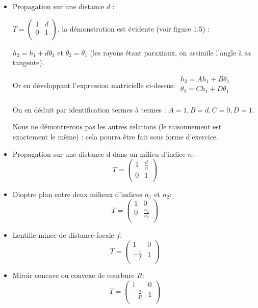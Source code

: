 \documentclass{book}
\begin{document}
\begin{itemize}[label=\textbullet, font=\LARGE \color{blue}]
    \item Propagation sur une distance $d$ :

$T = \begin{pmatrix}
            1 & d \\
            0 & 1 \\
            \end{pmatrix}$, la démonstration est évidente (voir figure 1.5) :

$h_2=h_1 + d \theta_2$ et $\theta_2 =\theta_1$ (les rayons étant paraxiaux, on assimile l'angle à sa tangente).

Or en développant l'expression matricielle ci-dessus: $\begin{matrix}
            h_2=Ah_1+B\theta_1 \\
            \theta_2 = Ch_1 +D\theta_1 \\
            \end{matrix}$

On en déduit par identification termes à termes : $A =1, B=d, C=0, D=1$.

Nous ne démontrerons pas les autres relations (le raisonnement est exactement le même) : cela pourra être fait sous forme d'exercice.
    \item Propagation sur une distance d dans un milieu d'indice $n$:$$T = \begin{pmatrix}
            1 & \frac d n \\
            0 & 1 \\
            \end{pmatrix}$$

    \item Dioptre plan entre deux milieux d'indices $n_1$ et $n_2$:$$T = \begin{pmatrix}
            1 &0 \\
            0 & {\frac{n_1}{n_2}} \\
            \end{pmatrix}$$

    \item Lentille mince de distance focale $f$:$$T = \begin{pmatrix}
            1 & 0 \\
            -\frac 1 f & 1 \\
            \end{pmatrix}$$

    \item Miroir concave ou convexe de courbure $R$:$$T = \begin{pmatrix}
            1 & 0 \\
            {-\frac{2}{R}} & 1 \\
            \end{pmatrix}$$
\end{itemize}
\end{document}
